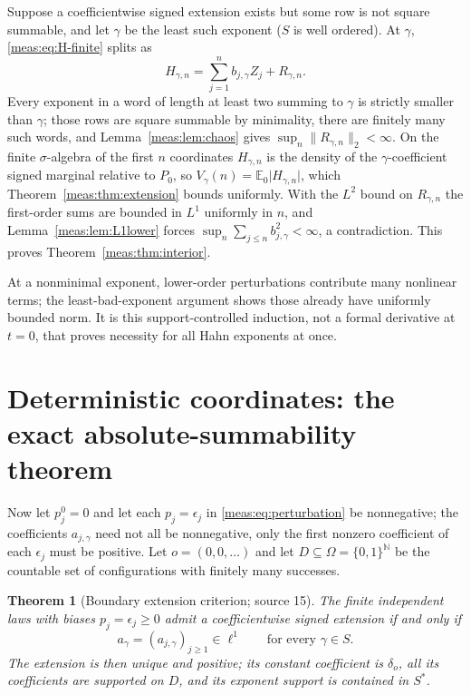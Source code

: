 \documentclass[11pt]{article}
\numberwithin{equation}{section}
\newtheorem{theorem}{Theorem}[section]
\theoremstyle{definition}
\theoremstyle{remark}
\newcommand{\N}{\mathbb N}
\newcommand{\E}{\mathbb E}
\newcommand{\norm}[1]{\lVert#1\rVert}
\newcommand{\abs}[1]{\lvert#1\rvert}
\begin{document}
Suppose a coefficientwise signed extension exists but some row is not square
summable, and let $\gamma$ be the least such exponent ($S$ is well ordered). At
$\gamma$, \eqref{meas:eq:H-finite} splits as
\begin{equation}\label{meas:eq:least-bad}
 H_{\gamma,n}=\sum_{j=1}^nb_{j,\gamma}Z_j+R_{\gamma,n}.
\end{equation}
Every exponent in a word of length at least two summing to $\gamma$ is strictly
smaller than $\gamma$; those rows are square summable by minimality, there are
finitely many such words, and Lemma~\ref{meas:lem:chaos} gives
$\sup_n\norm{R_{\gamma,n}}_2<\infty$. On the finite $\sigma$-algebra of the first $n$
coordinates $H_{\gamma,n}$ is the density of the $\gamma$-coefficient signed marginal
relative to $P_0$, so $V_\gamma(n)=\E_0\abs{H_{\gamma,n}}$, which
Theorem~\ref{meas:thm:extension} bounds uniformly. With the $L^2$ bound on
$R_{\gamma,n}$ the first-order sums are bounded in $L^1$ uniformly in $n$, and
Lemma~\ref{meas:lem:L1lower} forces $\sup_n\sum_{j\le n}b_{j,\gamma}^2<\infty$, a
contradiction. This proves Theorem~\ref{meas:thm:interior}.

At a nonminimal exponent, lower-order perturbations contribute many nonlinear
terms; the least-bad-exponent argument shows those already have uniformly
bounded norm. It is this support-controlled induction, not a formal derivative
at $t=0$, that proves necessity for all Hahn exponents at once.

\section{Deterministic coordinates: the exact absolute-summability theorem}
\label{meas:sec:boundary}

Now let $p_j^0=0$ and let each $p_j=\epsilon_j$ in \eqref{meas:eq:perturbation} be
nonnegative; the coefficients $a_{j,\gamma}$ need not all be nonnegative, only the
first nonzero coefficient of each $\epsilon_j$ must be positive. Let
$o=(0,0,\ldots)$ and let $D\subseteq\Omega=\{0,1\}^{\N}$ be the countable set of
configurations with finitely many successes.

\begin{theorem}[Boundary extension criterion; source 15]
\label{meas:thm:boundary}
The finite independent laws with biases $p_j=\epsilon_j\ge0$ admit a
coefficientwise signed extension if and only if
\begin{equation}\label{meas:eq:boundary-l1}
 a_\gamma=(a_{j,\gamma})_{j\ge1}\in\ell^1\qquad\text{for every }\gamma\in S.
\end{equation}
The extension is then unique and positive; its constant coefficient is
$\delta_o$, all its coefficients are supported on $D$, and its exponent support is
contained in $S^*$.
\end{theorem}
\end{document}
